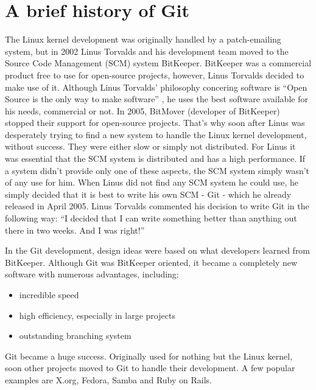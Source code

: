 \section {A brief history of Git}\label{githistory}

The Linux kernel development was originally handled by a patch-emailing system, but in 2002 Linus Torvalds and his development team moved to the Source Code Management (SCM) system BitKeeper. BitKeeper was a commercial product free to use for open-source projects, however, Linus Torvalds decided to make use of it. Although Linus Torvalds' philosophy concering software is "`Open Source is the only way to make software"' \cite{googletechtalk2007}, he uses the best software available for his needs, commercial or not.
In 2005, BitMover (developer of BitKeeper) stopped their support for open-source projects. That's why soon after Linus was desperately trying to find a new system to handle the Linux kernel development, without success. They were either slow or simply not distributed. For Linus it was essential that the SCM system is distributed and has a high performance. If a system didn't provide only one of these aspects, the SCM system simply wasn't of any use for him. When Linus did not find any SCM system he could use, he simply decided that it is best to write his own SCM - Git - which he already released in April 2005. Linus Torvalds commented his decision to write Git in the following way: "`I decided that I can write something better than anything out there in two weeks. And I was right!"'\cite{googletechtalk2007}

In the Git development, design ideas were based on what developers learned from BitKeeper. Although Git was BitKeeper oriented, it became a completely new software with numerous advantages, including:

\begin{itemize}
	\item incredible speed
	\item high efficiency, especially in large projects
	\item outstanding branching system
\end{itemize}
\cite{gitpro2009}

Git became a huge success. Originally used for nothing but the Linux kernel, soon other projects moved to Git to handle their development. A few popular examples are X.org, Fedora, Samba and Ruby on Rails. \cite{gitinternals2008}